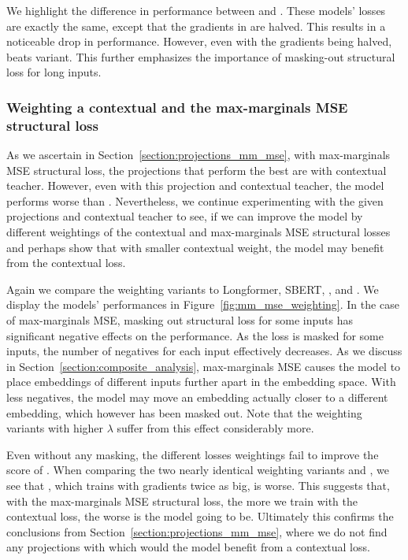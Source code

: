 We highlight the difference in performance between 
and . These models' losses are exactly the same, except
that the gradients in  are halved. This results in a
noticeable drop in performance. However, even with the gradients being halved,
 beats  variant. This further
emphasizes the importance of masking-out structural loss for long inputs.

\subsubsection{Weighting a contextual and the max-marginals MSE structural
loss}

As we ascertain in Section~\ref{section:projections_mm_mse}, with max-marginals
MSE structural loss, the projections that perform the best are
 with  contextual
teacher. However, even with this projection and contextual teacher, the model
performs worse than . Nevertheless, we continue
experimenting with the given projections and contextual teacher to see, if we
can improve the model by different weightings of the contextual and
max-marginals MSE structural losses and perhaps show that with smaller
contextual weight, the model may benefit from the contextual loss.

Again we compare the weighting variants to Longformer, SBERT, ,
and . We display the models' performances in
Figure~\ref{fig:mm_mse_weighting}. In the case of max-marginals MSE, masking
out structural loss for some inputs has significant negative effects on the
performance. As the loss is masked for some inputs, the number of negatives for
each input effectively decreases. As we discuss in
Section~\ref{section:composite_analysis}, max-marginals MSE causes the model to
place embeddings of different inputs further apart in the embedding space. With
less negatives, the model may move an embedding actually closer to a different
embedding, which however has been masked out. Note that the weighting variants
with higher $\lambda$ suffer from this effect considerably more.

Even without any masking, the different losses weightings fail to improve the
score of . When comparing the two nearly
identical weighting variants  and
, we see that , which trains
with gradients twice as big, is worse. This suggests that, with the
max-marginals MSE structural loss, the more we train with the contextual loss,
the worse is the model going to be. Ultimately this confirms the conclusions
from Section~\ref{section:projections_mm_mse}, where we do not find any
projections with which would the model benefit from a contextual loss.

